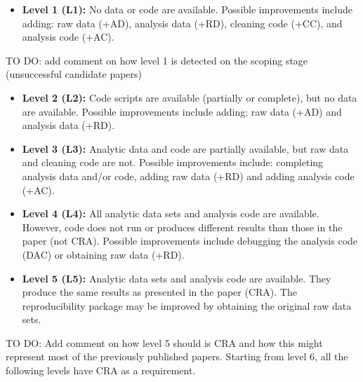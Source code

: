 \documentclass[]{book}
\providecommand{\tightlist}{%
  \setlength{\itemsep}{0pt}\setlength{\parskip}{0pt}}
\begin{document}
\begin{itemize}
\tightlist
\item
  \textbf{Level 1 (L1):} No data or code are available. Possible improvements include adding: raw data (+AD), analysis data (+RD), cleaning code (+CC), and analysis code (+AC).
\end{itemize}

TO DO: add comment on how level 1 is detected on the scoping stage (unsuccessful candidate papers)

\begin{itemize}
\item
  \textbf{Level 2 (L2):} Code scripts are available (partially or complete), but no data are available. Possible improvements include adding: raw data (+AD) and analysis data (+RD).
\item
  \textbf{Level 3 (L3):} Analytic data and code are partially available, but raw data and cleaning code are not. Possible improvements include: completing analysis data and/or code, adding raw data (+RD) and adding analysis code (+AC).
\item
  \textbf{Level 4 (L4):} All analytic data sets and analysis code are available. However, code does not run or produces different results than those in the paper (not CRA). Possible improvements include debugging the analysis code (DAC) or obtaining raw data (+RD).
\item
  \textbf{Level 5 (L5):} Analytic data sets and analysis code are available. They produce the same results as presented in the paper (CRA). The reproducibility package may be improved by obtaining the original raw data sets.
\end{itemize}

TO DO: Add comment on how level 5 should is CRA and how this might represent most of the previously published papers. Starting from level 6, all the following levels have CRA as a requirement.
\end{document}
